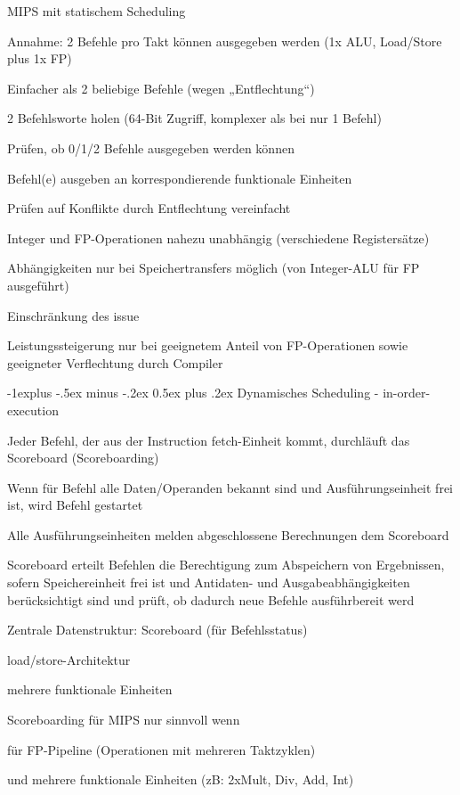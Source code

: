 \documentclass[10pt,landscape]{article}
\makeatletter
\renewcommand{\subsection}{\@startsection{subsection}{2}{0mm}%
                                {-1explus -.5ex minus -.2ex}%
                                {0.5ex plus .2ex}%
                                {\normalfont\normalsize\bfseries}}
\makeatother
\begin{document}
\begin{multicols}{3}
  MIPS mit statischem Scheduling
  \begin{itemize*}
    \item Annahme: 2 Befehle pro Takt können ausgegeben werden (1x ALU, Load/Store plus 1x FP)
    \item Einfacher als 2 beliebige Befehle (wegen „Entflechtung“)
    \item 2 Befehlsworte holen (64-Bit Zugriff, komplexer als bei nur 1 Befehl)
    \item Prüfen, ob 0/1/2 Befehle ausgegeben werden können
    \item Befehl(e) ausgeben an korrespondierende funktionale Einheiten
    \item Prüfen auf Konflikte durch Entflechtung vereinfacht
    \item Integer und FP-Operationen nahezu unabhängig (verschiedene Registersätze)
    \item Abhängigkeiten nur bei Speichertransfers möglich (von Integer-ALU für FP ausgeführt) \item Einschränkung des issue 
    \item Leistungssteigerung nur bei geeignetem Anteil von FP-Operationen sowie geeigneter Verflechtung durch Compiler
  \end{itemize*}
  
  \subsection{Dynamisches Scheduling - in-order-execution}
  \begin{itemize*}
    \item Jeder Befehl, der aus der Instruction fetch-Einheit kommt, durchläuft das Scoreboard (Scoreboarding)
    \item Wenn für Befehl alle Daten/Operanden bekannt sind und Ausführungseinheit frei ist, wird Befehl gestartet
    \item Alle Ausführungseinheiten melden abgeschlossene Berechnungen dem Scoreboard
    \item Scoreboard erteilt Befehlen die Berechtigung zum Abspeichern von Ergebnissen, sofern Speichereinheit frei ist und Antidaten- und Ausgabeabhängigkeiten berücksichtigt sind und prüft, ob dadurch neue Befehle ausführbereit werd
    \item Zentrale Datenstruktur: Scoreboard (für Befehlsstatus)
    \item load/store-Architektur
    \item mehrere funktionale Einheiten
    \item Scoreboarding für MIPS nur sinnvoll wenn
    \item für FP-Pipeline (Operationen mit mehreren Taktzyklen)
    \item und mehrere funktionale Einheiten (zB: 2xMult, Div, Add, Int)
  \end{itemize*}
  

\end{multicols}
\end{document}
